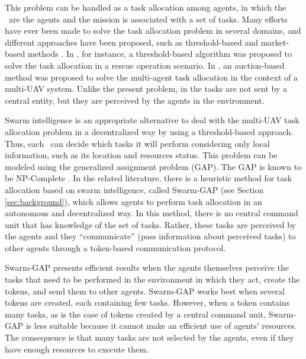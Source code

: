 This problem can be handled as a task allocation among agents, in which the \uavs\ are the agents and the mission is associated with a set of tasks. Many efforts have ever been made to solve the task allocation problem in several domains, and different approaches have been proposed, such as threshold-based \cite{ferreira2007swarm,scerri2005allocatingLADCOP,ferreira2010robocup,ikemoto2010adaptive} and market-based methods \cite{lemaire2004distributed,landen2010complex,ibri2012multi,tolmidis2013multi}. In \cite{scerri2005allocatingLADCOP}, for instance, a threshold-based algorithm was proposed to solve the task allocation in a rescue operation scenario. In \cite{landen2010complex}, an auction-based method was proposed to solve the multi-agent task allocation in the context of a multi-UAV system. Unlike the present problem, in \cite{scerri2005allocatingLADCOP,landen2010complex} the tasks are not sent by a central entity, but they are perceived by the agents in the environment.

Swarm intelligence is an appropriate alternative to deal with the multi-UAV task allocation problem in a decentralized way by using a threshold-based approach. Thus, each \uav\ can decide which tasks it will perform considering only local information, such as its location and resources status. This problem can be modeled using the generalized assignment problem (GAP). The GAP is known to be NP-Complete \cite{shmoys1993approximation}.
In the related literature, there is a heuristic method for task allocation based on swarm intelligence, called Swarm-GAP\cite{ferreira2007swarm} (see Section \ref{sec:background}), which allows agents to perform task allocation in an autonomous and decentralized way.  In this method, there is no central command unit that has knowledge of the set of tasks. Rather,  these tasks are perceived by the agents and they ``communicate'' (pass information about perceived tasks) to  other agents through a token-based communication protocol.

Swarm-GAP presents efficient results when the agents themselves perceive the tasks that need to be performed in the environment in which they act, create the tokens, and send them to other agents. Swarm-GAP works best when several tokens are created, each containing few tasks.
However, when a token contains many tasks, as is the case of tokens created by a central command unit, Swarm-GAP is less suitable because it cannot make an efficient use of agents' resources. The consequence is that many tasks are not selected by the agents, even if they have enough resources to execute them.

